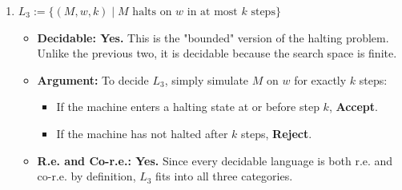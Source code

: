 \documentclass{article}
\theoremstyle{theorem}
\theoremstyle{definition}
\theoremstyle{remark}
\begin{document}
\begin{enumerate}
    \item \textbf{$L_3 := \{(M, w, k) \mid M \text{ halts on } w \text{ in at most } k \text{ steps}\}$}
    \begin{itemize}
        \item \textbf{Decidable: Yes.} This is the "bounded" version of the halting problem. Unlike the previous two, it is decidable because the search space is finite.
        \item \textbf{Argument:} To decide $L_3$, simply simulate $M$ on $w$ for exactly $k$ steps:
        \begin{itemize}
            \item If the machine enters a halting state at or before step $k$, \textbf{Accept}.
            \item If the machine has not halted after $k$ steps, \textbf{Reject}.
        \end{itemize}
        \item \textbf{R.e. and Co-r.e.: Yes.} Since every decidable language is both r.e. and co-r.e. by definition, $L_3$ fits into all three categories.
    \end{itemize}
\end{enumerate}
\end{document}
